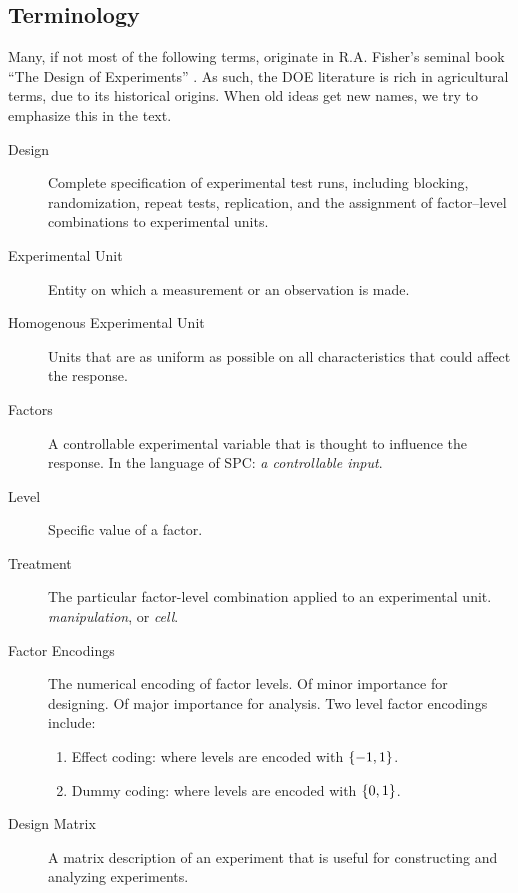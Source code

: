 \subsection{Terminology}
Many, if not most of the following terms, originate in R.A. Fisher's seminal book ``The Design of Experiments'' \citep{fisher_design_1960}. 
As such, the DOE literature is rich in agricultural terms, due to its historical origins.
When old ideas get new names, we try to emphasize this in the text.


\begin{tcolorbox}[breakable]
\begin{description}

\item [Design]  Complete specification of experimental test runs, including blocking, randomization, repeat tests, replication, and the assignment of factor–level combinations to experimental units.

\item [Experimental Unit]  Entity on which a measurement or an observation is made.

\item [Homogenous Experimental Unit] Units that are as uniform as possible on all characteristics that could affect the response.

\item [Factors]  A controllable experimental variable that is thought to influence the response. 
In the language of SPC: \emph{a controllable input}.

\item [Level] Specific value of a factor.

\item[Treatment] The particular factor-level combination applied to an experimental unit. 
\Aka \emph{manipulation}, or \emph{cell}.

\item [Factor Encodings] 
The numerical encoding of factor levels.
Of minor importance for designing. 
Of major importance for analysis.
Two level factor encodings include:
	\begin{enumerate}
	\item Effect coding: where levels are encoded with $\{ -1,1 \}$.
	\item Dummy coding: where levels are encoded with $\{ 0,1 \}$.
	\end{enumerate}

\item [Design Matrix] A matrix description of an experiment that is useful for constructing and analyzing experiments.


\end{description}
\end{tcolorbox}
